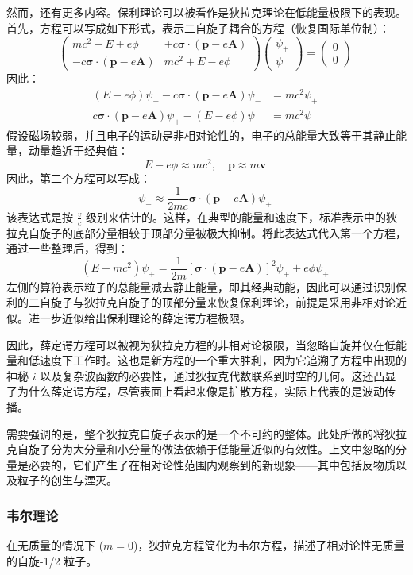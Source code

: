然而，还有更多内容。保利理论可以被看作是狄拉克理论在低能量极限下的表现。首先，方程可以写成如下形式，表示二自旋子耦合的方程（恢复国际单位制）：
\[
\begin{pmatrix} m c^2 - E + e \phi & + c \boldsymbol{\sigma} \cdot (\mathbf{p} - e \mathbf{A}) \\
- c \boldsymbol{\sigma} \cdot (\mathbf{p} - e \mathbf{A}) & m c^2 + E - e \phi \end{pmatrix}
\begin{pmatrix} \psi_+ \\ \psi_- \end{pmatrix}
= \begin{pmatrix} 0 \\ 0 \end{pmatrix}~
\]
因此：
\[
\begin{aligned}
(E - e \phi) \psi_+ - c \boldsymbol{\sigma} \cdot (\mathbf{p} - e \mathbf{A}) \psi_- &= m c^2 \psi_+ \\
c \boldsymbol{\sigma} \cdot (\mathbf{p} - e \mathbf{A}) \psi_+ - (E - e \phi) \psi_- &= m c^2 \psi_-
\end{aligned}~
\]
假设磁场较弱，并且电子的运动是非相对论性的，电子的总能量大致等于其静止能量，动量趋近于经典值：
\[
E - e \phi \approx m c^2, \quad \mathbf{p} \approx m \mathbf{v}~
\]
因此，第二个方程可以写成：
\[
\psi_- \approx \frac{1}{2m c} \boldsymbol{\sigma} \cdot (\mathbf{p} - e \mathbf{A}) \psi_+~
\]
该表达式是按 \( \frac{v}{c} \) 级别来估计的。这样，在典型的能量和速度下，标准表示中的狄拉克自旋子的底部分量相较于顶部分量被极大抑制。将此表达式代入第一个方程，通过一些整理后，得到：
\[
(E - m c^2) \psi_+ = \frac{1}{2m} \left[ \boldsymbol{\sigma} \cdot (\mathbf{p} - e \mathbf{A}) \right]^2 \psi_+ + e \phi \psi_+~
\]
左侧的算符表示粒子的总能量减去静止能量，即其经典动能，因此可以通过识别保利的二自旋子与狄拉克自旋子的顶部分量来恢复保利理论，前提是采用非相对论近似。进一步近似给出保利理论的薛定谔方程极限。

因此，薛定谔方程可以被视为狄拉克方程的非相对论极限，当忽略自旋并仅在低能量和低速度下工作时。这也是新方程的一个重大胜利，因为它追溯了方程中出现的神秘 \(i\) 以及复杂波函数的必要性，通过狄拉克代数联系到时空的几何。这还凸显了为什么薛定谔方程，尽管表面上看起来像是扩散方程，实际上代表的是波动传播。

需要强调的是，整个狄拉克自旋子表示的是一个不可约的整体。此处所做的将狄拉克自旋子分为大分量和小分量的做法依赖于低能量近似的有效性。上文中忽略的分量是必要的，它们产生了在相对论性范围内观察到的新现象——其中包括反物质以及粒子的创生与湮灭。
\subsubsection{韦尔理论}
在无质量的情况下 (\(m = 0\))，狄拉克方程简化为韦尔方程，描述了相对论性无质量的自旋-1/2 粒子。

